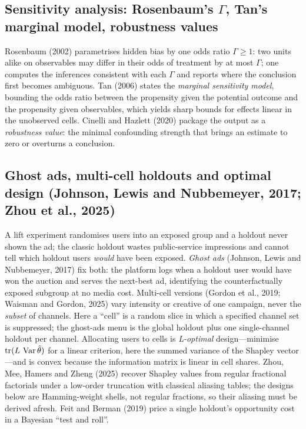 \subsection{Sensitivity analysis: Rosenbaum's $\Gamma$, Tan's marginal model, robustness values}

Rosenbaum (2002) parametrises hidden bias by one odds ratio $\Gamma \ge 1$: two units alike on observables may differ in their odds of treatment by at most $\Gamma$; one computes the inferences consistent with each $\Gamma$ and reports where the conclusion first becomes ambiguous. Tan (2006) states the \emph{marginal sensitivity model}, bounding the odds ratio between the propensity given the potential outcome and the propensity given observables, which yields sharp bounds for effects linear in the unobserved cells. Cinelli and Hazlett (2020) package the output as a \emph{robustness value}: the minimal confounding strength that brings an estimate to zero or overturns a conclusion.

\subsection{Ghost ads, multi-cell holdouts and optimal design (Johnson, Lewis and Nubbemeyer, 2017; Zhou et al., 2025)}

A lift experiment randomises users into an exposed group and a holdout never shown the ad; the classic holdout wastes public-service impressions and cannot tell which holdout users \emph{would} have been exposed. \emph{Ghost ads} (Johnson, Lewis and Nubbemeyer, 2017) fix both: the platform logs when a holdout user would have won the auction and serves the next-best ad, identifying the counterfactually exposed subgroup at no media cost. Multi-cell versions (Gordon et al., 2019; Waisman and Gordon, 2025) vary intensity or creative of one campaign, never the \emph{subset} of channels. Here a ``cell'' is a random slice in which a specified channel set is suppressed; the ghost-ads menu is the global holdout plus one single-channel holdout per channel. Allocating users to cells is \emph{L-optimal} design---minimise $\operatorname{tr}(L\,\operatorname{Var}\hat\theta)$ for a linear criterion, here the summed variance of the Shapley vector---and is convex because the information matrix is linear in cell shares. Zhou, Mee, Hamers and Zheng (2025) recover Shapley values from regular fractional factorials under a low-order truncation with classical aliasing tables; the designs below are Hamming-weight shells, not regular fractions, so their aliasing must be derived afresh. Feit and Berman (2019) price a single holdout's opportunity cost in a Bayesian ``test and roll''.

